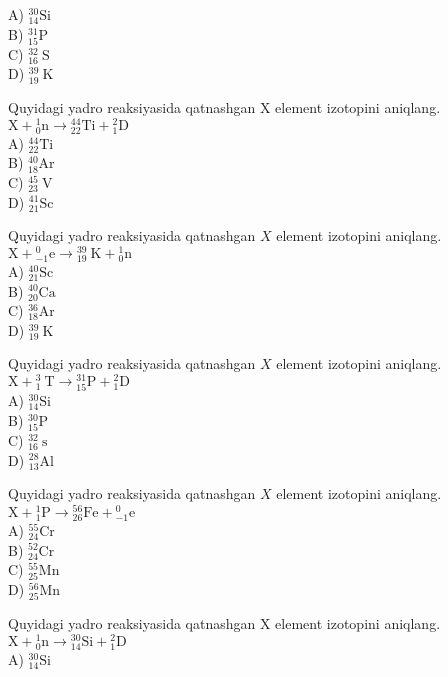 A) ${ }_{14}^{30} \mathrm{Si}$\\
B) ${ }_{15}^{31} \mathrm{P}$\\
C) ${ }_{16}^{32} \mathrm{~S}$\\
D) ${ }_{19}^{39} \mathrm{~K}$
  \item Quyidagi yadro reaksiyasida qatnashgan X element izotopini aniqlang. $\mathrm{X}+{ }_{0}^{1} \mathrm{n} \rightarrow{ }_{22}^{44} \mathrm{Ti}+{ }_{1}^{2} \mathrm{D}$\\
A) ${ }_{22}^{44} \mathrm{Ti}$\\
B) ${ }_{18}^{40} \mathrm{Ar}$\\
C) ${ }_{23}^{45} \mathrm{~V}$\\
D) ${ }_{21}^{41} \mathrm{Sc}$
  \item Quyidagi yadro reaksiyasida qatnashgan $X$ element izotopini aniqlang. $\mathrm{X}+{ }_{-1}^{0} \mathrm{e} \rightarrow{ }_{19}^{39} \mathrm{~K}+{ }_{0}^{1} \mathrm{n}$\\
A) ${ }_{21}^{40} \mathrm{Sc}$\\
B) ${ }_{20}^{40} \mathrm{Ca}$\\
C) ${ }_{18}^{36} \mathrm{Ar}$\\
D) ${ }_{19}^{39} \mathrm{~K}$
  \item Quyidagi yadro reaksiyasida qatnashgan $X$ element izotopini aniqlang. $\mathrm{X}+{ }_{1}^{3} \mathrm{~T} \rightarrow{ }_{15}^{31} \mathrm{P}+{ }_{1}^{2} \mathrm{D}$\\
A) ${ }_{14}^{30} \mathrm{Si}$\\
B) ${ }_{15}^{30} \mathrm{P}$\\
C) ${ }_{16}^{32} \mathrm{~s}$\\
D) ${ }_{13}^{28} \mathrm{Al}$
  \item Quyidagi yadro reaksiyasida qatnashgan $X$ element izotopini aniqlang. $\mathrm{X}+{ }_{1}^{1} \mathrm{P} \rightarrow{ }_{26}^{56} \mathrm{Fe}+{ }_{-1}^{0} \mathrm{e}$\\
A) ${ }_{24}^{55} \mathrm{Cr}$\\
B) ${ }_{24}^{52} \mathrm{Cr}$\\
C) ${ }_{25}^{55} \mathrm{Mn}$\\
D) ${ }_{25}^{56} \mathrm{Mn}$
  \item Quyidagi yadro reaksiyasida qatnashgan X element izotopini aniqlang. $\mathrm{X}+{ }_{0}^{1} \mathrm{n} \rightarrow{ }_{14}^{30} \mathrm{Si}+{ }_{1}^{2} \mathrm{D}$\\
A) ${ }_{14}^{30} \mathrm{Si}$\\
